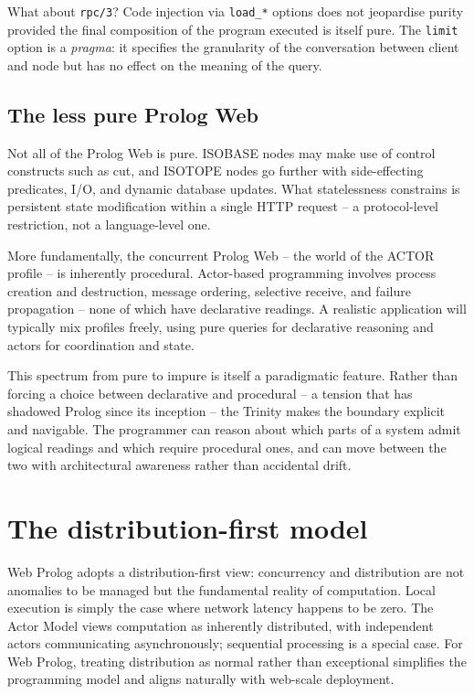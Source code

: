 What about \texttt{rpc/3}? Code injection via \texttt{load\_*} options
does not jeopardise purity provided the final composition of the program
executed is itself pure. The \texttt{limit} option is a \emph{pragma}:
it specifies the granularity of the conversation between client and node
but has no effect on the meaning of the query.


\subsection{The less pure Prolog Web}\label{sec:paradigm-less-pure}

Not all of the Prolog Web is pure. ISOBASE nodes may make use of control constructs such as cut, and ISOTOPE nodes go further with side-effecting predicates, I/O, and dynamic database updates. What statelessness constrains is persistent state modification within a single HTTP request -- a protocol-level restriction, not a language-level one.

More fundamentally, the concurrent Prolog Web -- the world of the ACTOR profile -- is inherently procedural. Actor-based programming involves process creation and destruction, message ordering, selective receive, and failure propagation -- none of which have declarative readings. A realistic application will typically mix profiles freely, using pure queries for declarative reasoning and actors for coordination and state.

This spectrum from pure to impure is itself a paradigmatic feature.
Rather than forcing a choice between declarative and procedural -- a
tension that has shadowed Prolog since its inception -- the Trinity
makes the boundary explicit and navigable. The programmer can reason
about which parts of a system admit logical readings and which require
procedural ones, and can move between the two with architectural
awareness rather than accidental drift.


\section{The distribution-first model}\label{sec:paradigm-distribution-first}

Web Prolog adopts a distribution-first view: concurrency and
distribution are not anomalies to be managed but the fundamental reality
of computation. Local execution is simply the case where network latency
happens to be zero. The Actor Model views computation as inherently
distributed, with independent actors communicating asynchronously;
sequential processing is a special case. For Web Prolog, treating
distribution as normal rather than exceptional simplifies the programming
model and aligns naturally with web-scale deployment.

